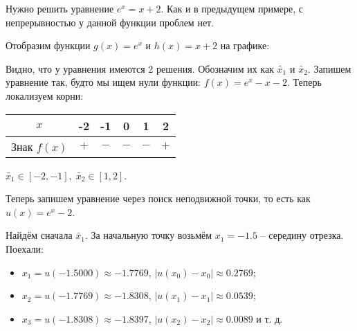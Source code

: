 \documentclass[main.tex]{subfile}
\begin{document}
\begin{example}
	Нужно решить уравнение \(e^x=x+2.\) Как и в предыдущем примере, с
	непрерывностью у данной функции проблем нет.

	Отобразим функции $g(x)=e^x$ и $h(x)=x+2$ на графике:
	\newline

	\newline

	Видно, что у уравнения имеются 2 решения. Обозначим их как $\widetilde{x_1}$
	и $\widetilde{x_2}$. Запишем уравнение так, будто мы ищем нули функции:
	$f(x) = e^x-x-2$. Теперь локализуем корни:
	\newline

	\begin{tabular}{ |c|c|c|c|c|c| }
		\hline
		$x$		& -2	& -1	& 0	& 1	& 2 \\
		\hline
		Знак $f(x)$ 	& $+$	& $-$	& $-$	& $-$ 	& $+$\\
		\hline
	\end{tabular}
	\newline

	$\widetilde{x_1}\in[-2,-1],\;\widetilde{x_2}\in[1,2]$.

	\newpage
	Теперь запишем уравнение через поиск неподвижной точки, то есть как
	$u(x)=e^x-2$.

	Найдём сначала $\widetilde{x_1}$. За начальную точку возьмём $x_1=-1.5$ --
	середину отрезка. Поехали:
	\begin{itemize}[noitemsep, nolistsep]
		\item $x_1=u(-1.5000)\approx -1.7769$, $|u(x_0)-x_0|\approx 0.2769$;
		\item $x_2=u(-1.7769)\approx -1.8308$, $|u(x_1)-x_1|\approx 0.0539$;
		\item $x_3=u(-1.8308)\approx -1.8397$, $|u(x_2)-x_2|\approx 0.0089$ и т. д.
	\end{itemize}


\end{example}
\end{document}
